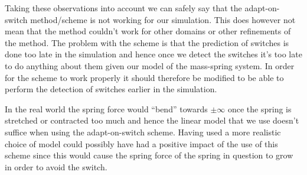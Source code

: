 \documentclass[11pt]{article}
\begin{document}
Taking these observations into account we can safely say that the
adapt-on-switch method/scheme is not working for our simulation. This does
however not mean that the method couldn't work for other domains or other
refinements of the method. The problem with the scheme is that the prediction
of switches is done too late in the simulation and hence once we detect
the switches it's too late to do anything about them given our model of
the mass-spring system. In order for the scheme to work properly it should
therefore be modified to be able to perform the detection of switches earlier
in the simulation.

In the real world the spring force would ``bend'' towards $\pm \infty$ once
the spring is stretched or contracted too much and hence the linear model that
we use doesn't suffice when using the adapt-on-switch scheme. Having used a
more realistic choice of model could possibly have had a positive impact of
the use of this scheme since this would cause the spring force of the spring
in question to grow in order to avoid the switch. 
\end{document}

